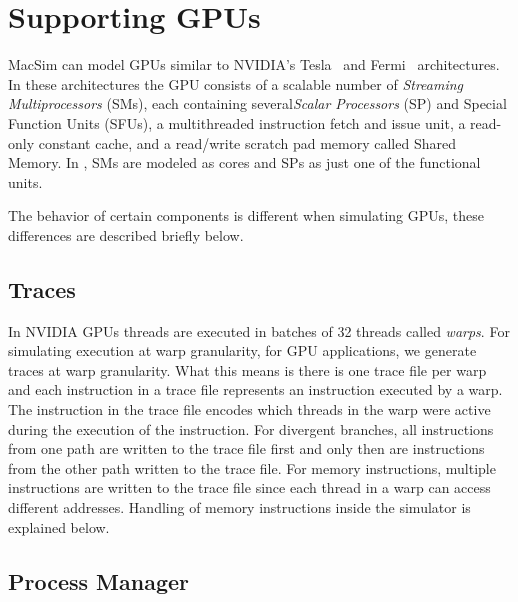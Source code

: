 
\chapter{Supporting GPUs}

MacSim can model GPUs similar to NVIDIA's Tesla~\cite{lin:nic08} and
Fermi~\cite{fermi} architectures.  In these architectures the GPU consists of a
scalable number of {\em Streaming Multiprocessors} (SMs), each containing
several{\em Scalar Processors} (SP) and Special Function Units (SFUs), a
multithreaded instruction fetch and issue unit, a read-only constant cache, and
a read/write scratch pad memory called Shared Memory.  In \SIM, SMs are modeled
as cores and SPs as just one of the functional units. 



The behavior of certain components is different when simulating GPUs, these
differences are described briefly below.

\section{Traces}
\label{sec:ptx_traces}

In NVIDIA GPUs threads are executed in batches of 32 threads called
\textit{warps}. For simulating execution at warp granularity, for GPU
applications, we generate traces at warp granularity. What this means is there
is one trace file per warp and each instruction in a trace file represents an
instruction executed by a warp. The instruction in the trace file encodes which
threads in the warp were active during the execution of the instruction. For
divergent branches, all instructions from one path are written to the trace
file first and only then are instructions from the other path written to the
trace file. For memory instructions, multiple instructions are written to the
trace file since each thread in a warp can access different addresses. Handling
of memory instructions inside the simulator is explained below.



\section{Process Manager}

